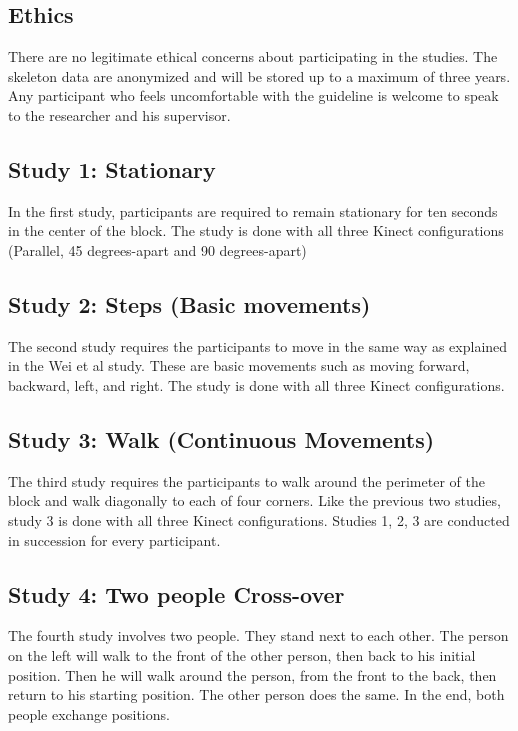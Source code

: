 \documentclass{sigchi}
\begin{document}
\subsection{Ethics}

There are no legitimate ethical concerns about participating in the studies. The skeleton data are anonymized and will be stored up to a maximum of three years. Any participant who feels uncomfortable with the guideline is welcome to speak to the researcher and his supervisor.

\subsection{Study 1: Stationary}

In the first study, participants are required to remain stationary for ten seconds in the center of the block. The study is done with all three Kinect configurations (Parallel, 45 degrees-apart and 90 degrees-apart)

\subsection{Study 2: Steps (Basic movements)}

The second study requires the participants to move in the same way as explained in the Wei et al study. These are basic movements such as moving forward, backward, left, and right. The study is done with all three Kinect configurations.

\subsection{Study 3: Walk (Continuous Movements)}

The third study requires the participants to walk around the perimeter of the block and walk diagonally to each of four corners. Like the previous two studies, study 3 is done with all three Kinect configurations. Studies 1, 2, 3 are conducted in succession for every participant.

\subsection{Study 4: Two people Cross-over}

The fourth study involves two people. They stand next to each other. The person on the left will walk to the front of the other person, then back to his initial position. Then he will walk around the person, from the front to the back, then return to his starting position. The other person does the same. In the end, both people exchange positions.
\end{document}
